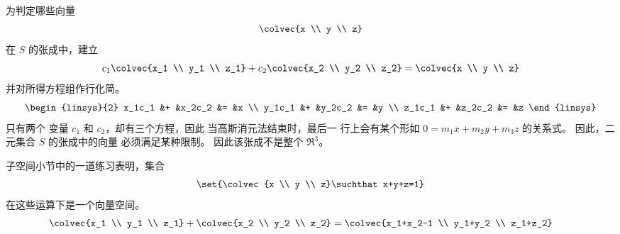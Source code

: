 \begin{exercises}
\begin{answer}
\begin{exparts}
\begin{equation*}
           \end{equation*}
           为判定哪些向量
           \begin{equation*}
             \colvec{x \\ y \\ z}
           \end{equation*}
           在 $S$ 的张成中，建立
           \begin{equation*}
             c_1\colvec{x_1 \\ y_1 \\ z_1}
             +c_2\colvec{x_2 \\ y_2 \\ z_2}
             =\colvec{x \\ y \\ z}
           \end{equation*}
           并对所得方程组作行化简。
           \begin{equation*}
             \begin{linsys}{2}
                x_1c_1  &+  &x_2c_2   &=  &x \\
                y_1c_1  &+  &y_2c_2   &=  &y \\
                z_1c_1  &+  &z_2c_2   &=  &z
             \end{linsys}
           \end{equation*}
           只有两个
           变量 $c_1$ 和 $c_2$，却有三个方程，因此
           当高斯消元法结束时，最后一
           行上会有某个形如
           $0=m_1x+m_2y+m_3z$ 的关系式。
           因此，二元集合 $S$ 的张成中的向量
           必须满足某种限制。
           因此该张成不是整个 $\Re^3$。
       \end{exparts}
    \end{answer}
  \item
    子空间小节中的一道练习表明，集合
    \begin{equation*}
      \set{\colvec{x \\ y \\ z}\suchthat x+y+z=1}
    \end{equation*}
    在这些运算下是一个向量空间。
    \begin{equation*}
      \colvec{x_1 \\ y_1 \\ z_1}+\colvec{x_2 \\ y_2 \\ z_2}
      =\colvec{x_1+x_2-1 \\ y_1+y_2 \\ z_1+z_2}
      \qquad

\end{equation*}
\end{exercises}
